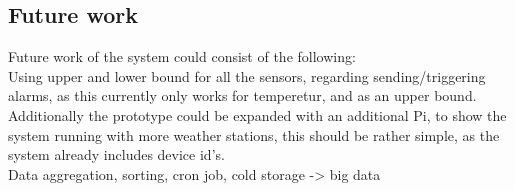 \subsection*{Future work}
Future work of the system could consist of the following:\\
Using upper and lower bound for all the sensors, regarding sending/triggering alarms, as this currently only works for temperetur, and as an upper bound.\\
Additionally the prototype could be expanded with an additional Pi, to show the system running with more weather stations, this should be rather simple, as the system already includes device id's.\\ 
Data aggregation, sorting, cron job, cold storage -> big data